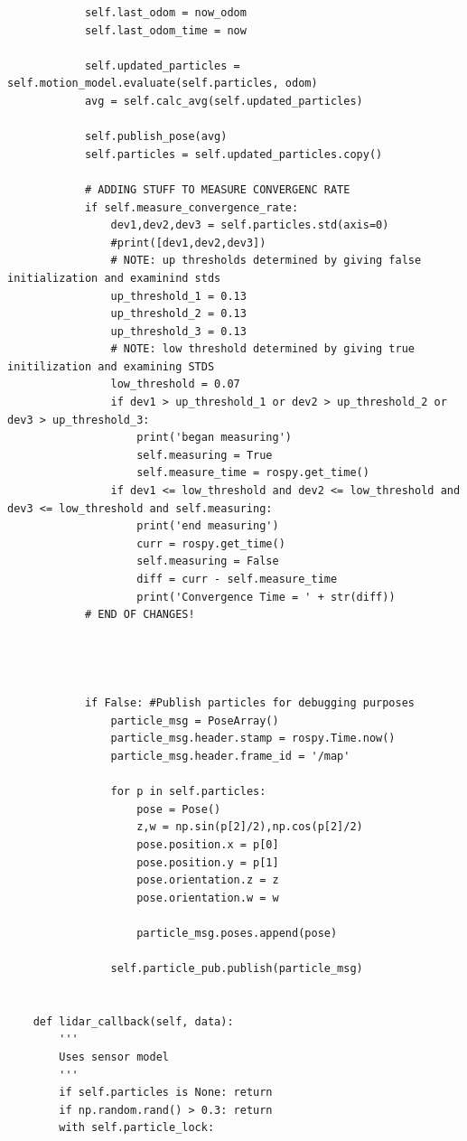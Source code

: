\documentclass{article}
\begin{document}
{\begin{verbatim}
            self.last_odom = now_odom
            self.last_odom_time = now
            
            self.updated_particles = self.motion_model.evaluate(self.particles, odom)
            avg = self.calc_avg(self.updated_particles)
            
            self.publish_pose(avg)
            self.particles = self.updated_particles.copy()

            # ADDING STUFF TO MEASURE CONVERGENC RATE
            if self.measure_convergence_rate:
                dev1,dev2,dev3 = self.particles.std(axis=0)
                #print([dev1,dev2,dev3])
                # NOTE: up thresholds determined by giving false initialization and examinind stds
                up_threshold_1 = 0.13
                up_threshold_2 = 0.13
                up_threshold_3 = 0.13
                # NOTE: low threshold determined by giving true initilization and examining STDS
                low_threshold = 0.07
                if dev1 > up_threshold_1 or dev2 > up_threshold_2 or dev3 > up_threshold_3:
                    print('began measuring')
                    self.measuring = True
                    self.measure_time = rospy.get_time()
                if dev1 <= low_threshold and dev2 <= low_threshold and dev3 <= low_threshold and self.measuring:
                    print('end measuring')
                    curr = rospy.get_time()
                    self.measuring = False
                    diff = curr - self.measure_time
                    print('Convergence Time = ' + str(diff))
            # END OF CHANGES!



            
            if False: #Publish particles for debugging purposes
                particle_msg = PoseArray()
                particle_msg.header.stamp = rospy.Time.now()
                particle_msg.header.frame_id = '/map'
                
                for p in self.particles:
                    pose = Pose()
                    z,w = np.sin(p[2]/2),np.cos(p[2]/2)
                    pose.position.x = p[0]
                    pose.position.y = p[1]
                    pose.orientation.z = z
                    pose.orientation.w = w
                    
                    particle_msg.poses.append(pose)
                
                self.particle_pub.publish(particle_msg)


    def lidar_callback(self, data):
        '''
        Uses sensor model
        '''
        if self.particles is None: return
        if np.random.rand() > 0.3: return
        with self.particle_lock:


\end{verbatim}}
\end{document}
